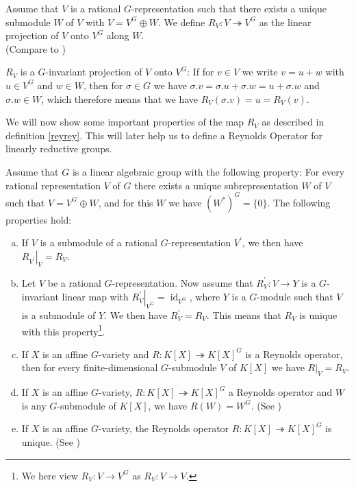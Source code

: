 \begin{definition}\label{reyrey}
  Assume that $V$ is a rational $G$-representation such that there exists a unique submodule $W$ of $V$ with $V = V^G \oplus W$.
  We define $R_V \colon V \twoheadrightarrow V^G$ as the linear projection of $V$ onto $V^G$ along $W$.  \\
  (Compare to \cite[2.2.5 (b)$\implies$(c)]{DK15})
\end{definition}

\begin{remark}
  $R_V$ is a $G$-invariant projection of $V$ onto $V^G$:
  If for $v \in V$ we write $v = u + w$ with $u \in V^G$ and $w \in W$, then for $\sigma \in G$ we have \linebreak$\sigma.v = \sigma.u + \sigma.w = u + \sigma.w$ and $\sigma.w \in W$, which therefore means that we have \linebreak$R_V(\sigma.v) = u = R_V(v)$.
\end{remark}

We will now show some important properties of the map $R_V$ as described in definition \ref{reyrey}.
This will later help us to define a Reynolds Operator for linearly reductive groups.

\begin{lemma}\label{lamm}
  Assume that $G$ is a linear algebraic group with the following \linebreak property:
  For every rational representation $V$ of $G$ there exists a unique subrepresentation $W$ of $V$ such that $V = V^G \oplus W$, and for this $W$ we have $(W^\ast)^G = \{0\}$.
  The following properties hold:
  \begin{enumerate}[(a)]
  \item If $V$ is a submodule of a rational $G$-representation $V^\prime$, we then have $\left. R_{V^\prime} \right|_V = R_V$.
  \item Let $V$ be a rational $G$-representation.
    Now assume that $R^\prime_V \colon V \rightarrow Y$ is a $G$-invariant linear map with $ \left. R^\prime_V \right|_{V^G} = \operatorname{id}_{V^G}$, where $Y$ is a $G$-module such that $V$ is a submodule of $Y$.
    We then have $R^\prime_V = R_V$.
    This means that $R_V$ is unique with this property\footnote{We here view $R_V \colon V \rightarrow V^G$ as $R_V \colon V \rightarrow V$.}.
  \item If $X$ is an affine $G$-variety and $R \colon K[X] \twoheadrightarrow K[X]^G$ is a Reynolds \linebreak operator, then for every finite-dimensional $G$-submodule $V$ of $K[X]$ we have \linebreak$\left. R \right|_V = R_V$.
  \item If $X$ is an affine $G$-variety, $R \colon K[X] \twoheadrightarrow K[X]^G$ a Reynolds operator and $W$ is any $G$-submodule of $K[X]$, we have $R(W) = W^G$.  (See \cite[2.2.7]{DK15})
  \item If $X$ is an affine $G$-variety, the Reynolds operator $R\colon K[X] \twoheadrightarrow K[X]^G$ is unique.  (See \cite[2.2.5 (b)$\implies$(c)]{DK15})
  \end{enumerate}
\end{lemma}

